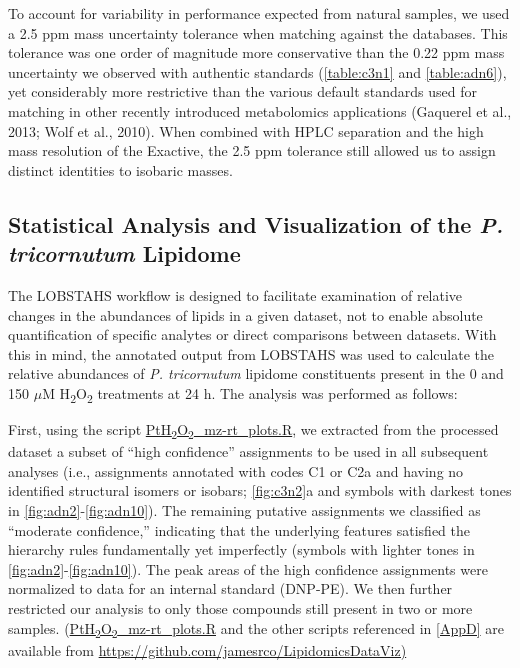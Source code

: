 To account for variability in performance expected from natural samples, we used a 2.5 ppm mass uncertainty tolerance when matching against the databases. This tolerance was one order of magnitude more conservative than the 0.22 ppm mass uncertainty we observed with authentic standards (\autoref{table:c3n1} and \autoref{table:adn6}), yet considerably more restrictive than the various default standards used for matching in other recently introduced metabolomics applications (Gaquerel et al., 2013; Wolf et al., 2010). When combined with HPLC separation and the high mass resolution of the Exactive, the 2.5 ppm tolerance still allowed us to assign distinct identities to isobaric masses.

\subsection{Statistical Analysis and Visualization of the \emph{P. tricornutum} Lipidome }

The LOBSTAHS workflow is designed to facilitate examination of relative changes in the abundances of lipids in a given dataset, not to enable absolute quantification of specific analytes or direct comparisons between datasets. With this in mind, the annotated output from LOBSTAHS was used to calculate the relative abundances of \emph{P. tricornutum} lipidome constituents present in the 0 and 150 $\mu$M H\textsubscript{2}O\textsubscript{2} treatments at 24 h. The analysis was performed as follows:

First, using the script \href{https://github.com/jamesrco/LipidomicsDataViz/blob/master/LOBSTAHS/PtH\textsubscript{2}O\textsubscript{2}_mz-rt_plots.R}{PtH\textsubscript{2}O\textsubscript{2}\_mz-rt\_plots.R}, we extracted from the processed dataset a subset of ``high confidence'' assignments to be used in all subsequent analyses (i.e., assignments annotated with codes C1 or C2a and having no identified structural isomers or isobars; \autoref{fig:c3n2}a and symbols with darkest tones in \autoref{fig:adn2}-\autoref{fig:adn10}). The remaining putative assignments we classified as ``moderate confidence,'' indicating that the underlying features satisfied the hierarchy rules fundamentally yet imperfectly (symbols with lighter tones in \autoref{fig:adn2}-\autoref{fig:adn10}). The peak areas of the high confidence assignments were normalized to data for an internal standard (DNP-PE). We then further restricted our analysis to only those compounds still present in two or more samples. (\href{https://github.com/jamesrco/LipidomicsDataViz/blob/master/LOBSTAHS/PtH\textsubscript{2}O\textsubscript{2}_mz-rt_plots.R}{PtH\textsubscript{2}O\textsubscript{2}\_mz-rt\_plots.R} and the other scripts referenced in \autoref{AppD} are available from \url{https://github.com/jamesrco/LipidomicsDataViz)}

